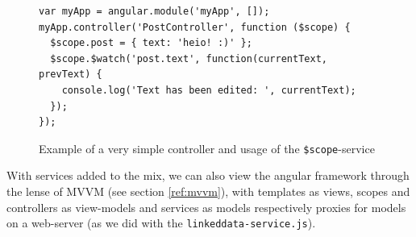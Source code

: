 \begin{figure}
\centering
\begin{verbatim}
var myApp = angular.module('myApp', []);
myApp.controller('PostController', function ($scope) {
  $scope.post = { text: 'heio! :)' };
  $scope.$watch('post.text', function(currentText, prevText) {
    console.log('Text has been edited: ', currentText);
  });
});
\end{verbatim}
\caption{Example of a very simple controller and usage of the \texttt{\$scope}-service}
\label{fig:ng-simple-ctrl}
\end{figure}

With services added to the mix, we can also view the angular framework through the lense of MVVM (see section \ref{ref:mvvm}), with templates as views, scopes and controllers as view-models and services as models respectively proxies for models on a web-server (as we did with the \texttt{linkeddata-service.js}).






